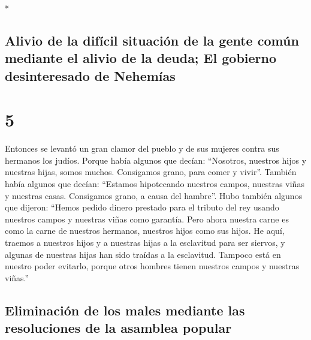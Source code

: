 \begin{paracol}{2}
\begin{otherlanguage}{english}
\end{otherlanguage}

\switchcolumn[0]*

\hypertarget{alivio-de-la-difuxedcil-situaciuxf3n-de-la-gente-comuxfan-mediante-el-alivio-de-la-deuda-el-gobierno-desinteresado-de-nehemuxedas}{%
\subsection{Alivio de la difícil situación de la gente común mediante el
alivio de la deuda; El gobierno desinteresado de
Nehemías}\label{alivio-de-la-difuxedcil-situaciuxf3n-de-la-gente-comuxfan-mediante-el-alivio-de-la-deuda-el-gobierno-desinteresado-de-nehemuxedas}}

\hypertarget{section-8}{%
\section{5}\label{section-8}}

 Entonces se levantó un gran clamor del pueblo y de sus
mujeres contra sus hermanos los judíos.  Porque había
algunos que decían: ``Nosotros, nuestros hijos y nuestras hijas, somos
muchos. Consigamos grano, para comer y vivir''.  También
había algunos que decían: ``Estamos hipotecando nuestros campos,
nuestras viñas y nuestras casas. Consigamos grano, a causa del hambre''.
 Hubo también algunos que dijeron: ``Hemos pedido dinero
prestado para el tributo del rey usando nuestros campos y nuestras viñas
como garantía.  Pero ahora nuestra carne es como la carne
de nuestros hermanos, nuestros hijos como sus hijos. He aquí, traemos a
nuestros hijos y a nuestras hijas a la esclavitud para ser siervos, y
algunas de nuestras hijas han sido traídas a la esclavitud. Tampoco está
en nuestro poder evitarlo, porque otros hombres tienen nuestros campos y
nuestras viñas.''

\hypertarget{eliminaciuxf3n-de-los-males-mediante-las-resoluciones-de-la-asamblea-popular}{%
\subsection{Eliminación de los males mediante las resoluciones de la
asamblea
popular}\label{eliminaciuxf3n-de-los-males-mediante-las-resoluciones-de-la-asamblea-popular}}


\end{paracol}
